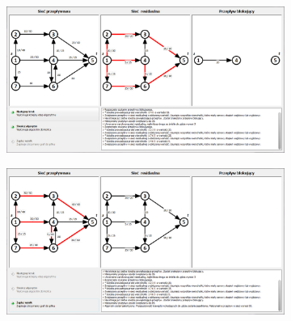 \begin{appendices}
\begin{figure}
\begin{subfigure}{\textwidth}
 		\end{subfigure}\par\bigskip
 		\begin{subfigure}{\textwidth}
 			\includegraphics[width=0.9\linewidth]{./img/dinic08.jpg}
 		\end{subfigure}
 		\begin{subfigure}{\textwidth}
 			\includegraphics[width=0.9\linewidth]{./img/dinic09.jpg}
 		\end{subfigure}
 	\end{figure}

\end{appendices}
